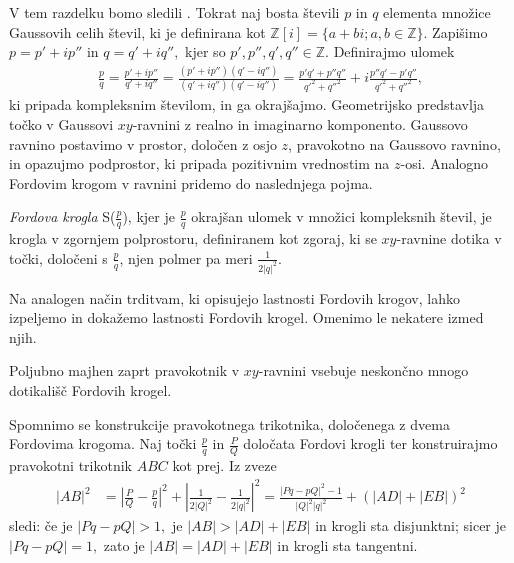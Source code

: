 \documentclass[mat1]{fmfdelo}
\newcommand{\Z}{\mathbb Z}
\begin{document}
V tem razdelku bomo sledili \cite[poglavje 8]{ford}.
Tokrat naj bosta števili $p$ in $q$ elementa množice Gaussovih celih števil, ki je definirana kot $\mathbb{Z}\left[{i}\right] = \{a+bi; a,b \in \Z \}.$ Zapišimo $p = p'+ip''$ in $q = q'+iq'',$ kjer so $p', p'', q', q'' \in \Z.$ Definirajmo ulomek
\begin{align} 
\frac{p}{q} = \frac{p'+ip''}{q'+iq''} = \frac{(p'+ip'')(q'-iq'')}{(q'+iq'')(q'-iq'')} = \frac{p'q'+p''q''}{q'^2+q''^2} + i \frac{p''q'-p'q''}{q'^2+q''^2},
\end{align}
ki pripada kompleksnim številom, in ga okrajšajmo. Geometrijsko predstavlja točko v Gaussovi $xy$-ravnini z realno in imaginarno komponento. Gaussovo ravnino postavimo v prostor, določen z osjo $z$, pravokotno na Gaussovo ravnino, in opazujmo podprostor, ki pripada pozitivnim vrednostim na $z$-osi. Analogno Fordovim krogom v ravnini pridemo do naslednjega pojma. 

\begin{definicija}
\emph{Fordova krogla} S($\frac{p}{q}$), kjer je $\frac{p}{q}$ okrajšan ulomek v množici kompleksnih števil, je krogla v zgornjem polprostoru, definiranem kot zgoraj, ki se $xy$-ravnine dotika v točki, določeni s $\frac{p}{q}$, njen polmer pa meri $\frac{1}{2|q|^2}.$
\end{definicija}

Na analogen način trditvam, ki opisujejo lastnosti Fordovih krogov, lahko izpeljemo in dokažemo lastnosti Fordovih krogel. Omenimo le nekatere izmed njih.

Poljubno majhen zaprt pravokotnik v $xy$-ravnini vsebuje neskončno mnogo dotikališč Fordovih krogel.

Spomnimo se konstrukcije pravokotnega trikotnika, določenega z dvema Fordovima krogoma. Naj točki $\frac{p}{q}$ in $\frac{P}{Q}$ določata Fordovi krogli ter konstruirajmo pravokotni trikotnik $ABC$ kot prej. Iz zveze
\begin{align*}
|AB|^2 
  &= \left |\frac{P}{Q} - \frac{p}{q} \right|^2 + \left |\frac{1}{2|Q|^2} - \frac{1}{2|q|^2} \right|^2 = \frac{|Pq-pQ|^2-1}{|Q|^2|q|^2} + (|AD| + |EB|)^2
\end{align*}
sledi:
če je $|Pq-pQ|>1,$ je $|AB|>|AD|+|EB|$ in krogli sta disjunktni;
sicer je $|Pq-pQ|=1,$ zato je $|AB|=|AD|+|EB|$ in krogli sta tangentni.
\end{document}
